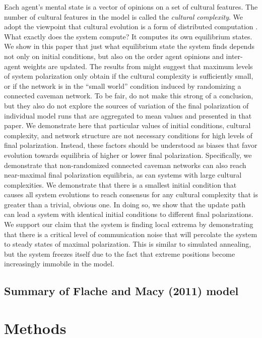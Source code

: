 \documentclass[11pt,letterpaper]{article}
\begin{document}
Each agent's mental state is a vector of opinions on a set of cultural features.
The number of cultural features in the model is called the \emph{cultural 
complexity}. We adopt the viewpoint that cultural evolution is a form
of distributed computation \cite{Smaldino2013}. What exactly does the system
compute? It computes its own equilibrium states. We show in this paper that
just what equilibrium state the system finds depends not only on initial
conditions, but also on the order agent opinions and inter-agent weights are 
updated. The results from  might suggest that maximum 
levels of system polarization only obtain if the cultural complexity is 
sufficiently small, or if the network is in the ``small world'' condition
induced by randomizing a connected caveman network. To be fair, 
do not make this strong of a conclusion, but they also do not explore the
sources of variation of the final polarization of individual model runs 
that are aggregated to mean values and presented in that paper.
We demonstrate here that particular values of 
initial conditions, cultural complexity, and 
network structure are not necessary conditions for high levels of 
final polarization. Instead, these factors should be understood as biases 
that favor evolution towards equilibria of higher or lower final polarization. 
Specifically, we demonstrate that non-randomized connected caveman 
networks can also reach near-maximal final polarization 
equilibria, as can systems with large cultural
complexities. We demonstrate that there is a smallest initial condition that
causes all system evolutions to reach consensus for any cultural complexity
that is greater than a trivial, obvious one. In doing so, we show that the
update path can lead a system with identical initial conditions to different 
final polarizations. We support our claim that the system is finding local 
extrema by demonstrating that there is a critical level of communication noise
that will percolate the system to steady states of maximal polarization. 
This is similar to simulated annealing, but the system freezes itself 
due to the fact that extreme positions become increasingly immobile in 
the  model.

\subsection{Summary of Flache and Macy (2011) model}

\section{Methods}
\label{sec:methods}
\end{document}
